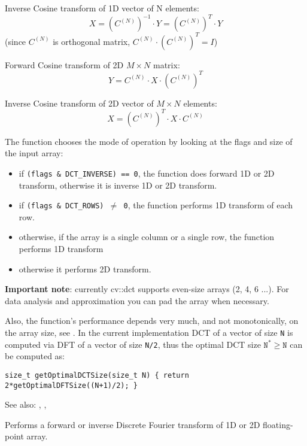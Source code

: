 Inverse Cosine transform of 1D vector of N elements:
\[X = \left(C^{(N)}\right)^{-1} \cdot Y = \left(C^{(N)}\right)^T \cdot Y\]
(since $C^{(N)}$ is orthogonal matrix, $C^{(N)} \cdot \left(C^{(N)}\right)^T = I$)

Forward Cosine transform of 2D $M \times N$ matrix:
\[Y = C^{(N)} \cdot X \cdot \left(C^{(N)}\right)^T\]

Inverse Cosine transform of 2D vector of $M \times N$ elements:
\[X = \left(C^{(N)}\right)^T \cdot X \cdot C^{(N)}\]

The function chooses the mode of operation by looking at the flags and size of the input array:
\begin{itemize}
    \item if \texttt{(flags \& DCT\_INVERSE) == 0}, the function does forward 1D or 2D transform, otherwise it is inverse 1D or 2D transform.
    \item if \texttt{(flags \& DCT\_ROWS) $\ne$ 0}, the function performs 1D transform of each row.
    \item otherwise, if the array is a single column or a single row, the function performs 1D transform
    \item otherwise it performs 2D transform.
\end{itemize}

\textbf{Important note}: currently cv::dct supports even-size arrays (2, 4, 6 ...). For data analysis and approximation you can pad the array when necessary.

Also, the function's performance depends very much, and not monotonically, on the array size, see . In the current implementation DCT of a vector of size \texttt{N} is computed via DFT of a vector of size \texttt{N/2}, thus the optimal DCT size $\texttt{N}^*\geq\texttt{N}$ can be computed as:

\begin{lstlisting}
size_t getOptimalDCTSize(size_t N) { return 2*getOptimalDFTSize((N+1)/2); }
\end{lstlisting}

See also: , , 


Performs a forward or inverse Discrete Fourier transform of 1D or 2D floating-point array.

